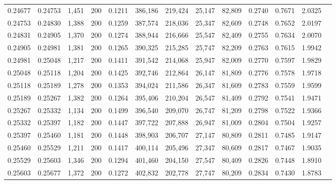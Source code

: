 \begin{tabular}{rrrrrrrrrrrrr}
0.24677 & 0.24753 &  1,451 & 200 &                                     0.1211 & 386,186 & 219,424 &  25,147 &  82,809 & 0.2740 & 0.7671 & 2.0325 \\
0.24753 & 0.24830 &  1,388 & 200 &                                     0.1259 & 387,574 & 218,036 &  25,347 &  82,609 & 0.2748 & 0.7652 & 2.0197 \\
0.24831 & 0.24905 &  1,370 & 200 &                                     0.1274 & 388,944 & 216,666 &  25,547 &  82,409 & 0.2755 & 0.7634 & 2.0070 \\
0.24905 & 0.24981 &  1,381 & 200 &                                     0.1265 & 390,325 & 215,285 &  25,747 &  82,209 & 0.2763 & 0.7615 & 1.9942 \\
0.24981 & 0.25048 &  1,217 & 200 &                                     0.1411 & 391,542 & 214,068 &  25,947 &  82,009 & 0.2770 & 0.7597 & 1.9829 \\
0.25048 & 0.25118 &  1,204 & 200 &                                     0.1425 & 392,746 & 212,864 &  26,147 &  81,809 & 0.2776 & 0.7578 & 1.9718 \\
0.25118 & 0.25189 &  1,278 & 200 &                                     0.1353 & 394,024 & 211,586 &  26,347 &  81,609 & 0.2783 & 0.7559 & 1.9599 \\
0.25189 & 0.25267 &  1,382 & 200 &                                     0.1264 & 395,406 & 210,204 &  26,547 &  81,409 & 0.2792 & 0.7541 & 1.9471 \\
0.25267 & 0.25332 &  1,134 & 200 &                                     0.1499 & 396,540 & 209,070 &  26,747 &  81,209 & 0.2798 & 0.7522 & 1.9366 \\
0.25332 & 0.25397 &  1,182 & 200 &                                     0.1447 & 397,722 & 207,888 &  26,947 &  81,009 & 0.2804 & 0.7504 & 1.9257 \\
0.25397 & 0.25460 &  1,181 & 200 &                                     0.1448 & 398,903 & 206,707 &  27,147 &  80,809 & 0.2811 & 0.7485 & 1.9147 \\
0.25460 & 0.25529 &  1,211 & 200 &                                     0.1417 & 400,114 & 205,496 &  27,347 &  80,609 & 0.2817 & 0.7467 & 1.9035 \\
0.25529 & 0.25603 &  1,346 & 200 &                                     0.1294 & 401,460 & 204,150 &  27,547 &  80,409 & 0.2826 & 0.7448 & 1.8910 \\
0.25603 & 0.25677 &  1,372 & 200 &                                     0.1272 & 402,832 & 202,778 &  27,747 &  80,209 & 0.2834 & 0.7430 & 1.8783 \\

\end{tabular}
